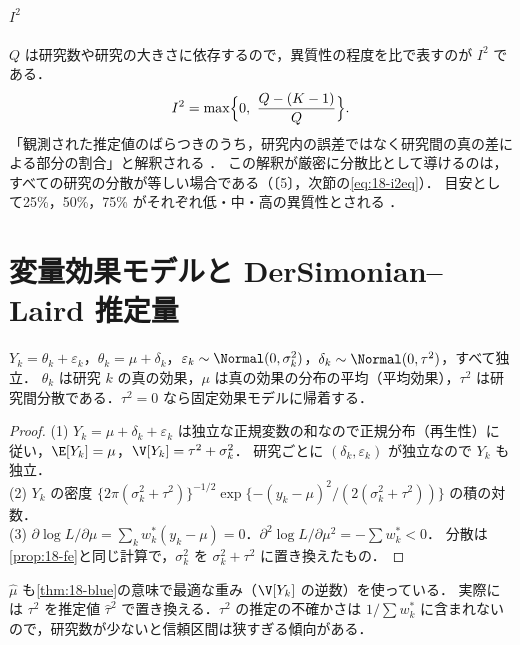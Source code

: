 \paragraph{$I^2$}
$Q$ は研究数や研究の大きさに依存するので，異質性の程度を比で表すのが $I^2$ である．
\begin{equation}
I^2=\max\Bigl\{0,\ \frac{Q-(K-1)}{Q}\Bigr\}.\label{eq:18-i2}
\end{equation}
「観測された推定値のばらつきのうち，研究内の誤差ではなく研究間の真の差による部分の割合」と解釈される \cite{higgins2002,higgins2003}．
この解釈が厳密に分散比として導けるのは，すべての研究の分散が等しい場合である（〔5〕，次節の\cref{eq:18-i2eq}）．
目安として25\%，50\%，75\% がそれぞれ低・中・高の異質性とされる \cite{higgins2003}．

\section{変量効果モデルと DerSimonian--Laird 推定量}\label{sec:18-random}
\Hissu\Hinshutsu
\begin{teigi}[変量効果モデル]\label{def:18-re}
$Y_k=\theta_k+\varepsilon_k$，$\theta_k=\mu+\delta_k$，$\varepsilon_k\sim\Normal(0,\sigma_k^2)$，$\delta_k\sim\Normal(0,\tau^2)$，すべて独立．
$\theta_k$ は研究 $k$ の真の効果，$\mu$ は真の効果の分布の平均（平均効果），$\tau^2$ は研究間分散である．$\tau^2=0$ なら固定効果モデルに帰着する．
\end{teigi}
\begin{proof}
(1) $Y_k=\mu+\delta_k+\varepsilon_k$ は独立な正規変数の和なので正規分布（再生性）に従い，$\E[Y_k]=\mu$，$\V[Y_k]=\tau^2+\sigma_k^2$．
研究ごとに $(\delta_k,\varepsilon_k)$ が独立なので $Y_k$ も独立．\\
(2) $Y_k$ の密度 $\{2\pi(\sigma_k^2+\tau^2)\}^{-1/2}\exp\{-(y_k-\mu)^2/(2(\sigma_k^2+\tau^2))\}$ の積の対数．\\
(3) $\partial\log L/\partial\mu=\sum_kw_k^*(y_k-\mu)=0$．$\partial^2\log L/\partial\mu^2=-\sum w_k^*<0$．
分散は\cref{prop:18-fe}と同じ計算で，$\sigma_k^2$ を $\sigma_k^2+\tau^2$ に置き換えたもの．
\end{proof}
$\hat\mu$ も\cref{thm:18-blue}の意味で最適な重み（$\V[Y_k]$ の逆数）を使っている．
実際には $\tau^2$ を推定値 $\hat\tau^2$ で置き換える．$\tau^2$ の推定の不確かさは $1/\sum w_k^*$ に含まれないので，研究数が少ないと信頼区間は狭すぎる傾向がある．

